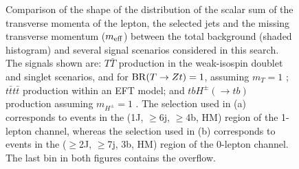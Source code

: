 \begin{figure}[h!]
\captionsetup{width=0.85\textwidth} \caption{\small Comparison of the shape of the distribution of the scalar sum of the transverse momenta of the lepton, the selected jets and the missing transverse momentum ($m_{\rm eff}$) between the total background (shaded histogram) and several signal scenarios considered in this search. The signals shown are: $T\bar{T}$ production in the weak-isospin doublet and singlet scenarios, and for ${\rm BR}(T\to Zt) = 1$, assuming $m_{T} = 1$ \tev; $t\bar{t}t\bar{t}$ production within an EFT model; and $tbH^{\pm}(\to tb)$ production assuming $m_{H^{\pm}} = 1$ \tev. The selection used in (a) corresponds to events in the (1J, $\ge$6j, $\ge$4b, HM) region of the 1-lepton channel, whereas the selection used in (b) corresponds to events in the ($\ge$2J, $\ge$7j, 3b, HM) region of the 0-lepton channel. The last bin in both figures contains the overflow.}
\label{fig:vlq:discr:meff}
\end{figure}